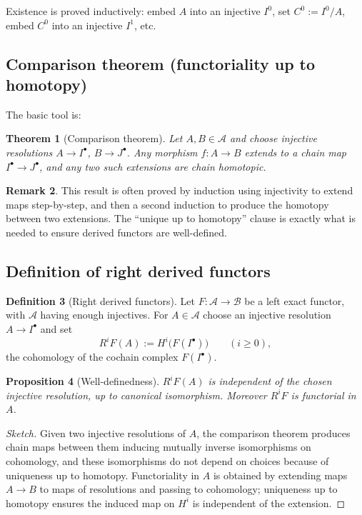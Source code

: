 \documentclass[11pt]{article}
\theoremstyle{definition}
\newtheorem{definition}{Definition}[section]
\newtheorem{remark}[definition]{Remark}
\theoremstyle{plain}
\newtheorem{theorem}[definition]{Theorem}
\newtheorem{proposition}[definition]{Proposition}
\begin{document}
Existence is proved inductively: embed $A$ into an injective $I^0$, set $C^0:=I^0/A$, embed $C^0$ into an injective $I^1$, etc.

\subsection{Comparison theorem (functoriality up to homotopy)}

The basic tool is:

\begin{theorem}[Comparison theorem]\label{thm:comparison}
Let $A,B\in\mathcal{A}$ and choose injective resolutions $A\to I^\bullet$, $B\to J^\bullet$.
Any morphism $f:A\to B$ extends to a chain map $I^\bullet\to J^\bullet$, and any two such extensions are chain homotopic.
\end{theorem}

\begin{remark}
This result is often proved by induction using injectivity to extend maps step-by-step, and then a second induction to produce the homotopy between two extensions. The ``unique up to homotopy'' clause is exactly what is needed to ensure derived functors are well-defined.
\end{remark}

\subsection{Definition of right derived functors}

\begin{definition}[Right derived functors]\label{def:derived-functors}
Let $F:\mathcal{A}\to\mathcal{B}$ be a left exact functor, with $\mathcal{A}$ having enough injectives.
For $A\in\mathcal{A}$ choose an injective resolution $A\to I^\bullet$ and set
\[
R^iF(A):=H^i\bigl(F(I^\bullet)\bigr)\qquad (i\ge 0),
\]
the cohomology of the cochain complex $F(I^\bullet)$.
\end{definition}

\begin{proposition}[Well-definedness]\label{prop:well-defined}
$R^iF(A)$ is independent of the chosen injective resolution, up to canonical isomorphism.
Moreover $R^iF$ is functorial in $A$.
\end{proposition}

\begin{proof}[Sketch]
Given two injective resolutions of $A$, the comparison theorem produces chain maps between them inducing mutually inverse isomorphisms on cohomology, and these isomorphisms do not depend on choices because of uniqueness up to homotopy.
Functoriality in $A$ is obtained by extending maps $A\to B$ to maps of resolutions and passing to cohomology; uniqueness up to homotopy ensures the induced map on $H^i$ is independent of the extension.
\end{proof}
\end{document}

